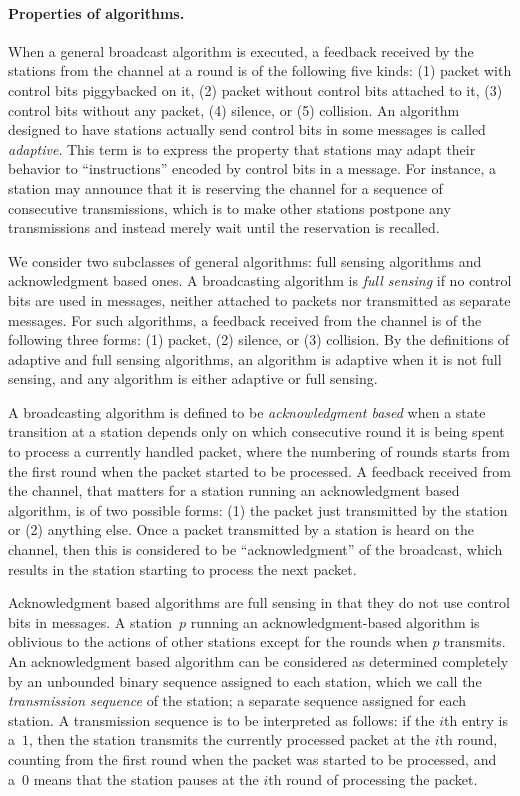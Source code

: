 \documentclass[11pt]{article}
\newcommand{\BBB}{\vspace*{-\bigskipamount}}
\newcommand{\Paragraph}[1]{\BBB\paragraph{#1}}
\begin{document}

\Paragraph{Properties of algorithms.}




When a general broadcast algorithm is executed, a feedback received by the stations from the channel at a round is of the following five kinds: (1) packet with control bits piggybacked on it, (2) packet without control bits attached to it,  (3) control bits without any packet, (4) silence, or (5) collision.
An algorithm designed to have stations actually send control bits in some messages is called \emph{adaptive}.
This term is to express the property that stations may adapt their behavior  to ``instructions''  encoded by control bits in a message.
For instance, a station may announce that it is reserving the channel for a sequence of consecutive transmissions, which is to make other stations postpone any transmissions and instead merely wait until the reservation is recalled.

We consider two subclasses of general algorithms: full sensing algorithms and acknowledgment based ones.
A broadcasting algorithm is \emph{full sensing} if no control bits are used in messages, neither attached to packets nor transmitted as separate messages.
For such algorithms, a feedback received from the channel is of the following three forms: (1) packet, (2) silence, or (3) collision.
By the definitions of adaptive and full sensing algorithms, an algorithm is adaptive when it is not full sensing, and any algorithm is either adaptive or full sensing.

A broadcasting algorithm is defined to be \emph{acknowledgment based} when a state transition at a station depends only on which consecutive round it is being spent to process a  currently handled packet, where the numbering of rounds starts from the first round when the packet started to be processed.
A feedback received from the channel, that matters for a station running an acknowledgment based algorithm, is of two possible forms: (1) the packet just transmitted by the station or (2) anything else.
Once a packet transmitted by a station is heard on the channel, then this is considered to be ``acknowledgment'' of the broadcast, which results in the station starting to process the next packet.

Acknowledgment based algorithms are full sensing in that they do not use control bits in messages.
A station~$p$ running an acknowledgment-based algorithm is oblivious to the actions of other stations except for the rounds when $p$ transmits.
An acknowledgment based algorithm can be considered as determined completely by an unbounded binary sequence assigned to each station, which we call the \emph{transmission sequence} of the station; a separate sequence assigned for each station.
A transmission sequence is to be interpreted as follows: if the $i$th entry is a~$1$, then the station transmits the currently processed packet at the $i$th round, counting from the first round when the packet was started to be processed, and a~$0$ means that the station pauses at the $i$th round of processing the packet.
\end{document}
